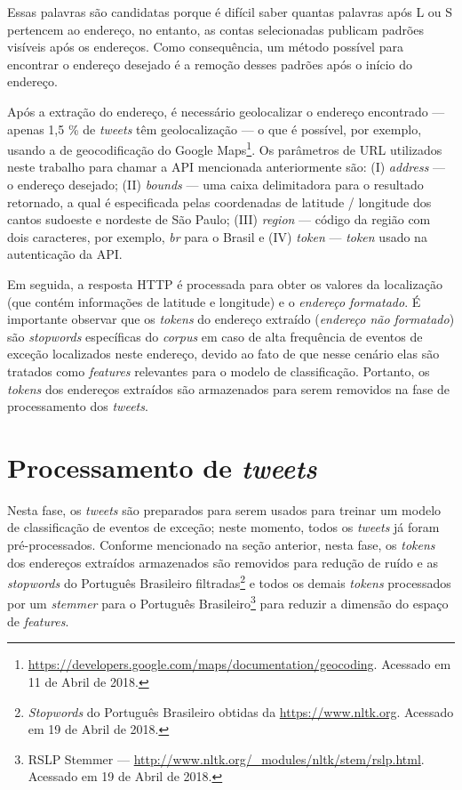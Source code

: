 \documentclass[
	12pt,				%
	oneside,			%
	a4paper,			%
	english,			%
	brazil				%
	]{abntex2ppgsi}
\begin{document}
Essas palavras são candidatas porque é difícil saber quantas palavras após L ou S pertencem ao endereço, no entanto, as contas selecionadas publicam padrões visíveis após os endereços. Como consequência, um método possível para encontrar o endereço desejado é a remoção desses padrões após o início do endereço.

Após a extração do endereço, é necessário geolocalizar o endereço encontrado --- apenas 1,5 \% de \textit {tweets} têm geolocalização \cite{niu2016community} --- o que é possível, por exemplo, usando a  de geocodificação do Google Maps\footnote {\url {https://developers.google.com/maps/documentation/geocoding}. Acessado em 11 de Abril de 2018.}. Os parâmetros de URL utilizados neste trabalho para chamar a API mencionada anteriormente são: (I) \emph {address} --- o endereço desejado; (II) \emph {bounds} --- uma caixa delimitadora para o resultado retornado, a qual é especificada pelas coordenadas de latitude / longitude dos cantos sudoeste e nordeste de São Paulo; (III) \emph {region} --- código da região com dois caracteres, por exemplo, \textit{br} para o Brasil e (IV) \emph {token} --- \textit{token} usado na autenticação da API.

Em seguida, a resposta HTTP é processada para obter os valores da localização (que contém informações de latitude e longitude) e o \emph{endereço formatado}. É importante observar que os \textit{tokens} do endereço extraído (\emph{endereço não formatado}) são \textit{stopwords} específicas do \textit{corpus} em caso de alta frequência de eventos de exceção localizados neste endereço, devido ao fato de que nesse cenário elas são tratados como \textit{features} relevantes para o modelo de classificação. Portanto, os \textit{tokens} dos endereços extraídos são armazenados para serem removidos na fase de processamento dos \textit{tweets}.

\section{Processamento de \textit{tweets}}
\label{processing}

Nesta fase, os \textit {tweets} são preparados para serem usados para treinar um modelo de classificação de eventos de exceção; neste momento, todos os \textit {tweets} já foram pré-processados. Conforme mencionado na seção anterior, nesta fase, os \textit{tokens} dos endereços extraídos armazenados são removidos para redução de ruído e as \textit{stopwords} do Português Brasileiro filtradas\footnote{\textit{Stopwords} do Português Brasileiro obtidas da  \url{https://www.nltk.org}. Acessado em 19 de Abril de 2018.} e todos os demais \textit{tokens}  processados por um \textit{stemmer} para o  Português Brasileiro\footnote{RSLP Stemmer --- \url {http://www.nltk.org/\_modules/nltk/stem/rslp.html}. Acessado em 19 de Abril de 2018.} para reduzir a dimensão do espaço de \textit{features}.
\end{document}
